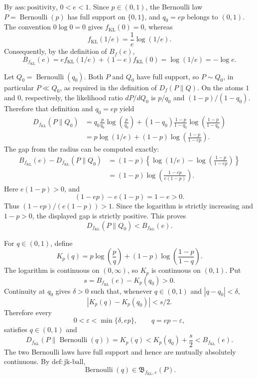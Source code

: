By \(\mathrm{ass{:}positivity}\), \(0<e<1\). Since \(p\in(0,1)\), the Bernoulli law \(P=\operatorname{Bernoulli}(p)\) has full support on \(\{0,1\}\), and \(q_0=ep\) belongs to \((0,1)\). The convention \(0\log 0=0\) gives \(f_{\mathrm{KL}}(0)=0\), whereas
\[
f_{\mathrm{KL}}(1/e)=\frac{1}{e}\log(1/e).
\]
Consequently, by the definition of \(B_f(e)\),
\[
B_{f_{\mathrm{KL}}}(e)
=e f_{\mathrm{KL}}(1/e)+(1-e)f_{\mathrm{KL}}(0)
=\log(1/e)=-\log e.
\]

Let \(Q_0=\operatorname{Bernoulli}(q_0)\). Both \(P\) and \(Q_0\) have full support, so \(P\sim Q_0\), in particular \(P\ll Q_0\), as required in the definition of \(D_f(P\|Q)\). On the atoms \(1\) and \(0\), respectively, the likelihood ratio \(dP/dQ_0\) is \(p/q_0\) and \((1-p)/(1-q_0)\). Therefore that definition and \(q_0=ep\) yield
\[
\begin{aligned}
D_{f_{\mathrm{KL}}}(P\|Q_0)
&=q_0\frac{p}{q_0}\log\!\left(\frac{p}{q_0}\right)
 +(1-q_0)\frac{1-p}{1-q_0}
   \log\!\left(\frac{1-p}{1-q_0}\right)\\
&=p\log(1/e)+(1-p)\log\!\left(\frac{1-p}{1-ep}\right).
\end{aligned}
\]
The gap from the radius can be computed exactly:
\[
\begin{aligned}
B_{f_{\mathrm{KL}}}(e)-D_{f_{\mathrm{KL}}}(P\|Q_0)
&=(1-p)\left\{\log(1/e)
-\log\!\left(\frac{1-p}{1-ep}\right)\right\}\\
&=(1-p)\log\!\left(\frac{1-ep}{e(1-p)}\right).
\end{aligned}
\]
Here \(e(1-p)>0\), and
\[
(1-ep)-e(1-p)=1-e>0.
\]
Thus \((1-ep)/(e(1-p))>1\). Since the logarithm is strictly increasing and \(1-p>0\), the displayed gap is strictly positive. This proves
\[
D_{f_{\mathrm{KL}}}(P\|Q_0)<B_{f_{\mathrm{KL}}}(e).
\]

For \(q\in(0,1)\), define
\[
K_p(q)=p\log\!\left(\frac{p}{q}\right)
+(1-p)\log\!\left(\frac{1-p}{1-q}\right).
\]
The logarithm is continuous on \((0,\infty)\), so \(K_p\) is continuous on \((0,1)\). Put
\[
s=B_{f_{\mathrm{KL}}}(e)-K_p(q_0)>0.
\]
Continuity at \(q_0\) gives \(\delta>0\) such that, whenever \(q\in(0,1)\) and \(|q-q_0|<\delta\),
\[
|K_p(q)-K_p(q_0)|<s/2.
\]
Therefore every
\[
0<\varepsilon<\min\{\delta,ep\},
\qquad q=ep-\varepsilon,
\]
satisfies \(q\in(0,1)\) and
\[
D_{f_{\mathrm{KL}}}\!\left(P\middle\|\operatorname{Bernoulli}(q)\right)
=K_p(q)<K_p(q_0)+\frac{s}{2}<B_{f_{\mathrm{KL}}}(e).
\]
The two Bernoulli laws have full support and hence are mutually absolutely continuous. By \(\mathrm{def{:}jk\text{-}ball}\),
\[
\operatorname{Bernoulli}(q)\in\mathfrak B_{f_{\mathrm{KL}},e}(P).
\]

